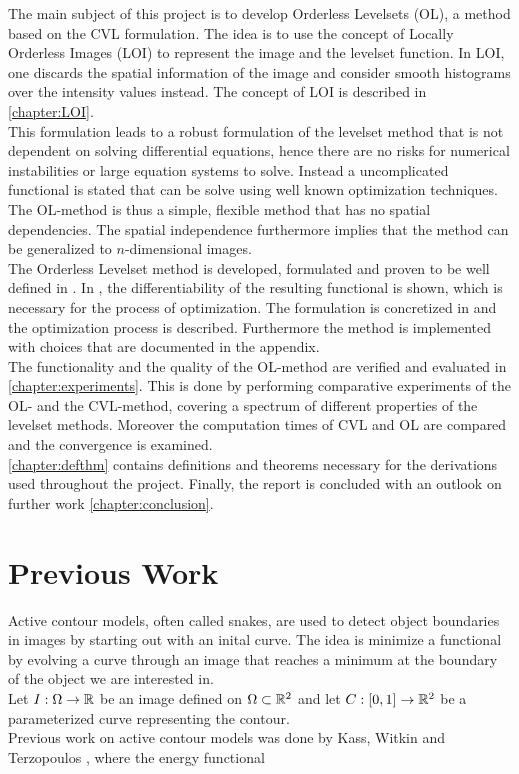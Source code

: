 The main subject of this project is to develop Orderless Levelsets (OL), a method based on the CVL formulation. The idea is to use the concept of Locally Orderless Images (LOI) to represent the image and the levelset function. In LOI, one discards the spatial information of the image and consider smooth histograms over the intensity values instead. The concept of LOI is described in \cref{chapter:LOI}.\\
This formulation leads to a robust formulation of the levelset method that is not dependent on solving differential equations, hence there are no risks for numerical instabilities or large equation systems to solve. Instead a uncomplicated functional is stated that can be solve using well known optimization techniques. The OL-method is thus a simple, flexible method that has no spatial dependencies. The spatial independence furthermore implies that the method can be generalized to $n$-dimensional images.\\
The Orderless Levelset method is developed, formulated and proven to be well defined in . In , the differentiability of the resulting functional is shown, which is necessary for the process of optimization. The formulation is concretized in  and the optimization process is described. Furthermore the method is implemented with choices that are documented in the appendix.\\

The functionality and the quality of the OL-method are verified and evaluated in \cref{chapter:experiments}. This is done by performing comparative experiments of the OL- and the CVL-method, covering a spectrum of different properties of the levelset methods. Moreover the computation times of CVL and OL are compared and the convergence is examined.\\
\cref{chapter:defthm} contains definitions and theorems necessary for the derivations used throughout the project. Finally, the report is concluded with an outlook on further work \cref{chapter:conclusion}.

\section{Previous Work}

Active contour models, often called snakes, are used to detect object boundaries in images by starting out with an inital curve. The idea is minimize a functional by evolving a curve through an image that reaches a minimum at the boundary of the object we are interested in.\\
Let $I:\Omega\to \mathbb R$ be an image defined on $\Omega\subset\mathbb R^2$ and let $C:[0,1]\to\mathbb R^2$ be a parameterized curve representing the contour.\\
Previous work on active contour models was done by Kass, Witkin and Terzopoulos \cite{kass.88}, where the energy functional

